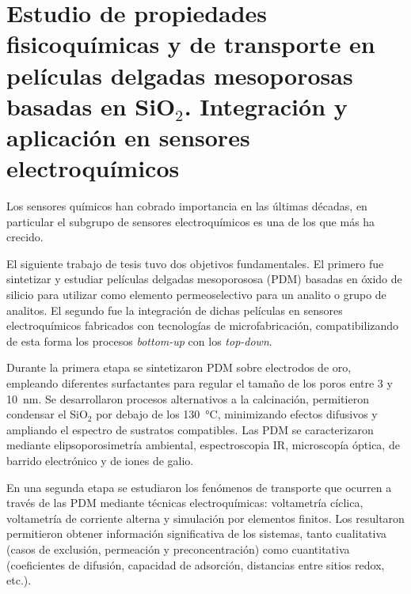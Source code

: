 \mtcaddchapter[Resumen]

\section*{\centering\large{\bfseries{Estudio de propiedades fisicoquímicas y de transporte en películas delgadas mesoporosas basadas en SiO$_2$. Integración y aplicación en sensores electroquímicos}}}

\vspace*{\fill}
Los sensores químicos han cobrado importancia en las últimas décadas, en particular el subgrupo de sensores electroquímicos es una de los que más ha crecido. 


El siguiente trabajo de tesis tuvo dos objetivos fundamentales. El primero fue sintetizar y estudiar películas delgadas mesoporososa (PDM) basadas en óxido de silicio para utilizar como elemento permeoselectivo para un analito o grupo de analitos. El segundo fue la integración de dichas películas en sensores electroquímicos fabricados con tecnologías de microfabricación, compatibilizando de esta forma los procesos \textit{bottom-up} con los \textit{top-down}.

Durante la primera etapa se sintetizaron PDM sobre electrodos de oro, empleando diferentes surfactantes para regular el tamaño de los poros entre 3 y \SI{10}{\nm}. Se desarrollaron procesos alternativos a la calcinación, permitieron condensar el SiO$_2$ por debajo de los \SI{130}{\celsius}, minimizando efectos difusivos y ampliando el espectro de sustratos compatibles. Las PDM se caracterizaron mediante elipsoporosimetría ambiental, espectroscopia IR, microscopía óptica, de barrido electrónico y de iones de galio.

En una segunda etapa se estudiaron los fenómenos de transporte que ocurren a través de las PDM mediante técnicas electroquímicas: voltametría cíclica, voltametría de corriente alterna y simulación por elementos finitos. Los resultaron permitieron obtener información significativa de los sistemas, tanto cualitativa (casos de exclusión, permeación y preconcentración) como cuantitativa (coeficientes de difusión, capacidad de adsorción, distancias entre sitios redox, etc.).

